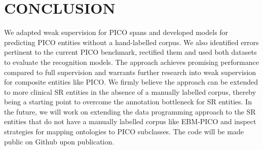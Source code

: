 \documentclass[10.7pt,]{article}
\begin{document}
\section{CONCLUSION}\label{conclusion}
%
We adapted weak supervision for PICO spans and developed models for predicting PICO entities without a hand-labelled corpus.
We also identified errors pertinent to the current PICO benchmark, rectified them and used both datasets to evaluate the recognition models.
The approach achieves promising performance compared to full supervision and warrants further research into weak supervision for composite entities like PICO.
We firmly believe the approach can be extended to more clinical SR entities in the absence of a manually labelled corpus, thereby being a starting point to overcome the annotation bottleneck for SR entities.
In the future, we will work on extending the data programming approach to the SR entities that do not have a manually labelled corpus like EBM-PICO and inspect strategies for mapping ontologies to PICO subclasses.
The code will be made public on Github upon publication.
%
%
%
\end{document}
